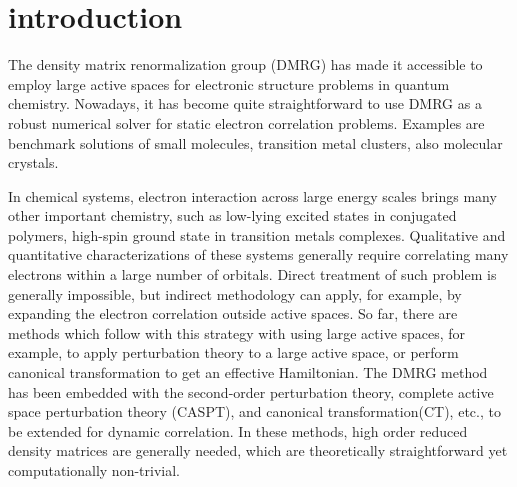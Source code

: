 
\section{introduction}

The density matrix renormalization group (DMRG) \cite{white_density_1992,white_density-matrix_1993} has made it accessible to employ large active spaces 
for electronic structure problems in quantum chemistry. Nowadays, it has become quite straightforward to use DMRG as a robust numerical solver for 
static electron correlation problems. Examples are benchmark solutions of small molecules\cite{chan_highly_2002}, transition metal 
clusters\cite{sharma_low-energy_2014, olivares-amaya_ab-initio_2015}, also molecular crystals\cite{yang_ab_2014}. 

In chemical systems, electron interaction across large energy scales brings many other important chemistry, such as low-lying excited states in 
conjugated polymers, high-spin ground state in transition metals complexes. Qualitative and quantitative characterizations of 
these systems generally require correlating many electrons within a large number of orbitals. Direct treatment of such problem is generally 
impossible, but indirect methodology can apply, for example, by expanding the electron correlation outside active spaces. So far, there are 
methods which follow with this strategy with using large active spaces, for example, to apply perturbation theory to a large active space, or 
perform canonical transformation to get an effective Hamiltonian.
The DMRG method has been embedded with the second-order perturbation theory\cite{kurashige_second-order_2011, sharma_communication:_2014}, 
complete active space perturbation theory (CASPT), and canonical transformation(CT)\cite{neuscamman_review_2010}, etc., to be extended for dynamic correlation. In these methods, high order reduced density matrices are generally needed, which are theoretically straightforward yet computationally non-trivial.

